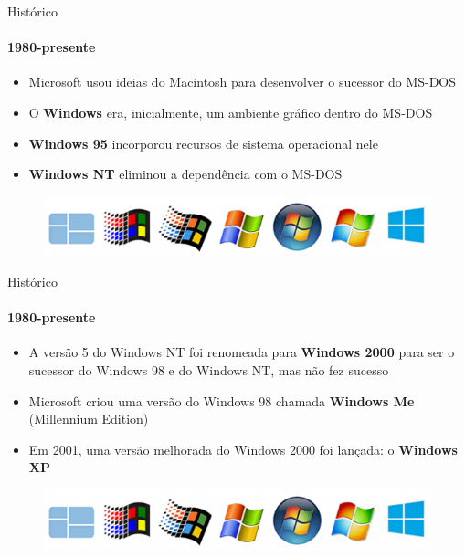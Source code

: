 \documentclass{beamer}
\begin{document}
\begin{frame}{Histórico}
	\framesubtitle{1980-presente}
	\begin{itemize}
		\item Microsoft usou ideias do Macintosh para desenvolver o sucessor do MS-DOS
		\item O \textbf{Windows} era, inicialmente, um ambiente gráfico dentro do MS-DOS
		\item \textbf{Windows 95} incorporou recursos de sistema operacional nele
		\item \textbf{Windows NT} eliminou a dependência com o MS-DOS
	\end{itemize}
	\begin{figure}
		\includegraphics[width=0.8\paperwidth]{resources/windows}
	\end{figure}
\end{frame}
\begin{frame}{Histórico}
	\framesubtitle{1980-presente}
	\begin{itemize}
		\item A versão 5 do Windows NT foi renomeada para \textbf{Windows 2000} para ser o sucessor do Windows 98 e do Windows NT, mas não fez sucesso
		\item Microsoft criou uma versão do Windows 98 chamada \textbf{Windows Me} (Millennium Edition)
		\item Em 2001, uma versão melhorada do Windows 2000 foi lançada: o \textbf{Windows XP}
	\end{itemize}
	\begin{figure}
		\includegraphics[width=0.8\paperwidth]{resources/windows}
	\end{figure}
\end{frame}
\end{document}
